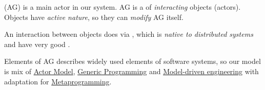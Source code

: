 \clearpage{}\secdown

\noindent {} (AG) is a main actor in our system. AG is a
 of \emph{interacting} objects (actors). Objects have
\emph{active nature}, so they can \emph{modify} AG itself.

\medskip\noindent
An interaction between objects does via , which is
\emph{native to distributed systems} and have very good .

\medskip\noindent
Elements of AG describes widely used elements of software systems, so our model
is mix of \href{http://en.wikipedia.org/wiki/Actor_model}{Actor Model},
\href{http://en.wikipedia.org/wiki/Generic_programming}{Generic Programming}
and \href{http://en.wikipedia.org/wiki/Model-driven_engineering}{Model-driven
engineering} with adaptation for
\href{http://en.wikipedia.org/wiki/Metaprogramming}{Metaprogramming}.


\secup
